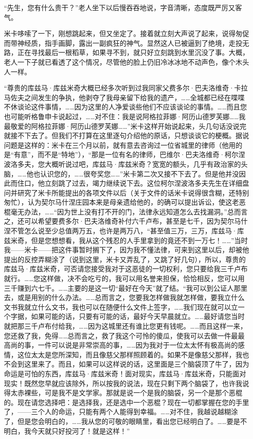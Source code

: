\par “先生，您有什么贵干？”老人坐下以后慢吞吞地说，字音清晰，态度既严厉又客气。
\par 米卡哆嗦了一下，刚想跳起来，但又坐定了。接着就立刻大声说了起来，说得匆促而带神经质，指手画脚，露出一副疯狂的神气。显然这人已被逼到了绝境，走投无路，正在寻找最后一根稻草，如果寻不到，就只好立刻跳到水里沉没了事。大概，老人一下子就已看透了这个情况，尽管他的脸上仍旧冷冰冰地不动声色，像个木头人一样。
\par “尊贵的库兹马·库兹米奇大概已经多次听到过我同家父费多尔·巴夫洛维奇·卡拉马佐夫之间发生的争执，他剥夺了我母亲留下给我的遗产，……全城都已经在喋喋不休谈论这件事情，……因为这里的人净爱谈些他们不应该谈论的事情。……而且您也可能听格鲁申卡说起过，……对不住：我是说阿格拉菲娜·阿历山德罗芙娜……我最敬爱的阿格拉菲娜·阿历山德罗芙娜……”米卡这样开始说起来，头几句话没说完就接不下去了。但我们不打算在这里逐句介绍他的原话，只想谈谈它的梗概。据说问题是这样的：米卡在三个月以前，就有意去咨询过一位省城里的律师（他用的是“有意”，而不是“特地”），“那是一位有名的律师，巴维尔·巴夫洛维奇·柯尔涅波洛多夫，您大概听说过吧，库兹马·库兹米奇？宽宽的额头，几乎有政治家的头脑，……他也认识您的，……很夸奖您……”米卡第二次又接不下去了。但是他并没因此而住口，他立刻跳了过去，竭力继续说下去。这位柯尔涅波洛多夫先生在详细盘问并研究了米卡所能提出的各项文件以后（关于文件的话米卡说得很含糊，还特别匆忙），认为契尔马什涅庄园本来是母亲遗给他的，的确可以提出诉讼，使这老恶棍毫无办法，……“因为世上没有打不开的门，法律永远知道怎么去找漏洞。”总而言之，还可以希望要费多尔·巴夫洛维奇补付六千卢布，甚至是七千，因为契尔马什涅不管怎么说至少总值两万五，也许是两万八，“甚至值三万，三万，库兹马·库兹米奇，但是您想想看，我从这个残忍的人手里拿到的竟还不到一万七！……”当时我——米卡——把这件事暂时搁下了，因为我不懂法律，可来到这里以后，却被他提出的反控弄糊涂了（说到这里，米卡又弄乱了，又跳了好几句），所以，尊贵的库兹马·库兹米奇，可否请您接受我对于这恶徒的一切权利，您只要给我三千卢布就行。……您这样做，决不会吃亏的，我可以用名誉来担保，恰恰相反，您可以用三千赚到六七千。……主要的是这一切“最好在今天”就了结。“我可以到公证人那里去，或是用别的什么办法。……总而言之，您要我怎样做我就怎样做，要我立什么文书我就立什么文书，我也可以在随便什么文件上签字，……我们现在就可以立一个字据，如果可能的话，只要有可能的话，最好今天早晨就立。……最好请您当时就把那三千卢布付给我，……因为这城里还有谁比您更有钱呢。……而且这样一来，您还救了我，免得……总而言之，救了我这个可怜的傻瓜，使我可以去做一件最最高尚的事，一件可以说是非常崇高的事，……因为我对于一位太太怀有极高尚的感情，这位太太是您所深知，而且像慈父那样照顾着的。如果不是像慈父那样，我也不会到这里来了。而且，如果可以这样说的话，这里面是三个脑袋顶了牛了，因为命运是可怕的东西，库兹马·库兹米奇！面对现实，库兹马·库兹米奇，只能面对现实！既然您早就应该除外，所以按我的说法，现在只剩下两个脑袋了，也许我说得太赤裸些，可是我不是文学家。那就是说一个是我的脑袋，另一个是那个恶棍的。现在请您选择吧：是选择我，还是选中一个恶棍？现在一切都掌握在您的手里了，——三个人的命运，只能有两个人能得到幸福。……对不住，我越说越糊涂了，但是您会明白的，……我从您的可敬的眼睛里，看出您已经明白了。……要是不明白，我今天就只好投河了！就是这样！”
